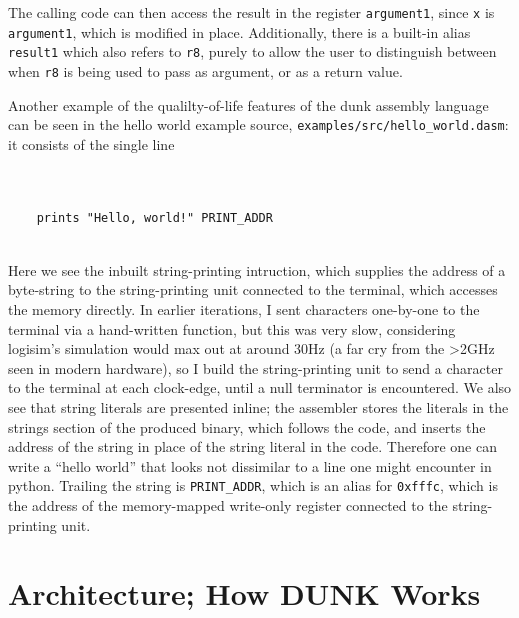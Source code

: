 \documentclass{article}
\begin{document}
The calling code can then access the result in the register \Verb|argument1|, since \Verb|x| is \Verb|argument1|, which is modified in place. Additionally, there is a built-in alias \Verb|result1| which also refers to \Verb|r8|, purely to allow the user to distinguish between when \Verb|r8| is being used to pass as argument, or as a return value.

Another example of the qualilty-of-life features of the dunk assembly language can be seen in the hello world example source, \Verb|examples/src/hello_world.dasm|: it consists of the single line

\begin{BVerbatim}


	prints "Hello, world!" PRINT_ADDR


\end{BVerbatim}

Here we see the inbuilt string-printing intruction, which supplies the address of a byte-string to the string-printing unit connected to the terminal, which accesses the memory directly. In earlier iterations, I sent characters one-by-one to the terminal via a hand-written function, but this was very slow, considering logisim's simulation would max out at around 30Hz (a far cry from the >2GHz seen in modern hardware), so I build the string-printing unit to send a character to the terminal at each clock-edge, until a null terminator is encountered. We also see that string literals are presented inline; the assembler stores the literals in the strings section of the produced binary, which follows the code, and inserts the address of the string in place of the string literal in the code. Therefore one can write a ``hello world'' that looks not dissimilar to a line one might encounter in python. Trailing the string is \Verb|PRINT_ADDR|, which is an alias for \Verb|0xfffc|, which is the address of the memory-mapped write-only register connected to the string-printing unit.

\newpage
\section{Architecture; How DUNK Works}
\end{document}
